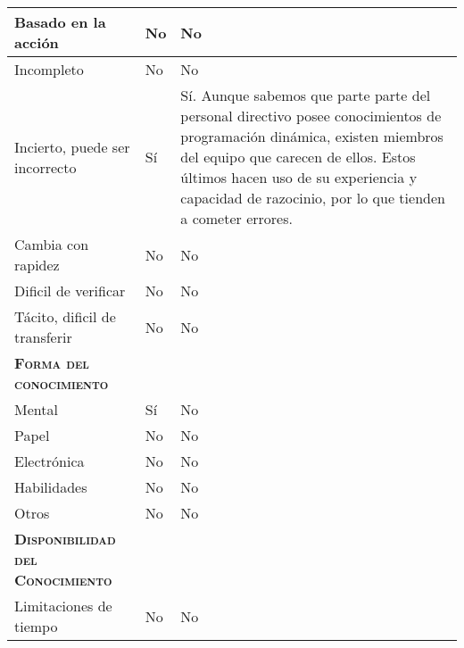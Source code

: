 \begin{table}[H]
{\begin{tabular}{|l|l|l|}
		Basado en la acción & \multicolumn{1}{p{1.0cm}|}{No} & \multicolumn{1}{p{13.0cm}|}{No}\\
		\hline

		Incompleto & \multicolumn{1}{p{1.0cm}|}{No} & \multicolumn{1}{p{13.0cm}|}{No}\\
		\hline

		Incierto, puede ser incorrecto & \multicolumn{1}{p{1.0cm}|}{Sí} & \multicolumn{1}{p{13.0cm}|}{Sí. Aunque sabemos que parte parte del personal directivo posee conocimientos de programación dinámica, existen miembros del equipo que carecen de ellos. Estos últimos hacen uso de su experiencia y capacidad de razocinio, por lo que tienden a cometer errores.}\\
		\hline

		Cambia con rapidez & \multicolumn{1}{p{1.0cm}|}{No} & \multicolumn{1}{p{13.0cm}|}{No}\\
		\hline

		Dificil de verificar & \multicolumn{1}{p{1.0cm}|}{No} & \multicolumn{1}{p{13.0cm}|}{No}\\
		\hline

		Tácito, dificil de transferir& \multicolumn{1}{p{1.0cm}|}{No} & \multicolumn{1}{p{13.0cm}|}{No}\\
		\hline

		\textsc {\textbf{Forma del conocimiento}}& \multicolumn{1}{p{1.0cm}|}{} & \multicolumn{1}{p{13.0cm}|}{}\\
		\hline

		Mental & \multicolumn{1}{p{1.0cm}|}{Sí} & \multicolumn{1}{p{13.0cm}|}{No}\\
		\hline

		Papel & \multicolumn{1}{p{1.0cm}|}{No} & \multicolumn{1}{p{13.0cm}|}{No}\\
		\hline

		Electrónica & \multicolumn{1}{p{1.0cm}|}{No} & \multicolumn{1}{p{13.0cm}|}{No}\\
		\hline

		Habilidades & \multicolumn{1}{p{1.0cm}|}{No} & \multicolumn{1}{p{13.0cm}|}{No}\\
		\hline

		Otros & \multicolumn{1}{p{1.0cm}|}{No} & \multicolumn{1}{p{13.0cm}|}{No}\\
		\hline

		\textsc {\textbf{Disponibilidad del Conocimiento}} & \multicolumn{1}{p{1.0cm}|}{} & \multicolumn{1}{p{13.0cm}|}{}\\
		\hline
		Limitaciones de tiempo& \multicolumn{1}{p{1.0cm}|}{No} & \multicolumn{1}{p{13.0cm}|}{No}\\
		\hline


\end{tabular}}
\end{table}

